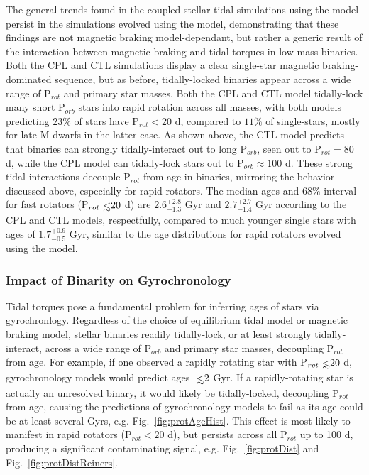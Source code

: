 \documentclass[twocolumn]{aastex61}
\def\lsim{~\rlap{$<$}{\lower 1.0ex\hbox{$\sim$}}}
\begin{document}
The general trends found in the coupled stellar-tidal simulations using the \citet{Matt2015} model persist in the simulations evolved using the \citet{Reiners2012} model, demonstrating that these findings are not magnetic braking model-dependant, but rather a generic result of the interaction between magnetic braking and tidal torques in low-mass binaries. Both the CPL and CTL simulations display a clear single-star magnetic braking-dominated sequence, but as before, tidally-locked binaries appear across a wide range of P$_{rot}$ and primary star masses. Both the CPL and CTL model tidally-lock many short P$_{orb}$ stars into rapid rotation across all masses, with both models predicting $23\%$ of stars have P$_{rot} < 20$ d, compared to $11\%$ of single-stars, mostly for late M dwarfs in the latter case. As shown above, the CTL model predicts that binaries can strongly tidally-interact out to long P$_{orb}$, seen out to P$_{rot} = 80$ d, while the CPL model can tidally-lock stars out to P$_{orb} \approx 100$ d. These strong tidal interactions decouple P$_{rot}$ from age in binaries, mirroring the behavior discussed above, especially for rapid rotators. The median ages and $68\%$ interval for fast rotators (P$_{rot} \lsim 20$ d) are $2.6^{+2.8}_{-1.3}$ Gyr and $2.7^{+2.7}_{-1.4}$ Gyr according to the CPL and CTL models, respectfully, compared to much younger single stars with ages of $1.7^{+0.9}_{-0.5}$ Gyr, similar to the age distributions for rapid rotators evolved using the \citet{Matt2015} model.   

\subsubsection{Impact of Binarity on Gyrochronology}

Tidal torques pose a fundamental problem for inferring ages of stars via gyrochronlogy. Regardless of the choice of equilibrium tidal model or magnetic braking model, stellar binaries readily tidally-lock, or at least strongly tidally-interact, across a wide range of P$_{orb}$ and primary star masses, decoupling P$_{rot}$ from age. For example, if one observed a rapidly rotating star with P$_{rot} \lsim 20$ d, gyrochronology models would predict ages $\lsim 2$ Gyr. If a rapidly-rotating star is actually an unresolved binary, it would likely be tidally-locked, decoupling P$_{rot}$ from age, causing the predictions of gyrochronology models to fail as its age could be at least several Gyrs, e.g. Fig.~\ref{fig:protAgeHist}. This effect is most likely to manifest in rapid rotators (P$_{rot} < 20$ d), but persists across all P$_{rot}$ up to 100 d, producing a significant contaminating signal, e.g. Fig.~\ref{fig:protDist} and Fig.~\ref{fig:protDistReiners}. 
\end{document}
